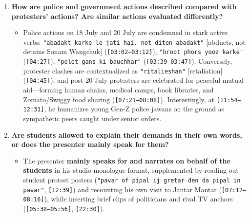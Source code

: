 \documentclass[10pt,a4paper]{article}
\begin{document}
\begin{enumerate}[leftmargin=1.6em, itemsep=4pt, topsep=4pt]
\begin{itemize}[leftmargin=1.4em, itemsep=2pt, topsep=2pt]
    \item Claims of foreign/political conspiracy are refuted by citing the \textbf{Ministry of External Affairs (MEA)} clarification that there was \texttt{"koi bhi pakistan, chaina ya phoren phanding nahin"} (\texttt{[00:40--00:48]}). Claims of police violence (\texttt{lathi charj}, \texttt{aansoo gais}, \texttt{pelet gans}, plainclothes harassment at \texttt{[03:39--04:17]}) are backed by ground eyewitness observation (\texttt{[07:12--08:16]}) and cellphone videos (\texttt{[04:53]}), while fairly acknowledging that \texttt{"wahan pe kaee sare police vale bhi hart hue the. ritalieshan mein un pe bhi hamla huaa tha"} (\texttt{[04:45--04:53]}). He also transparently notes CJP founder Abhijit Dipke's prior AAP social-media stint (\texttt{[02:19]}).
  \end{itemize}
  \item \textbf{How are police and government actions described compared with protesters' actions? Are similar actions evaluated differently?}
  \begin{itemize}[leftmargin=1.4em, itemsep=2pt, topsep=2pt]
    \item Police actions on 18 July and 20 July are condemned in stark active verbs: \texttt{"abadakt karke le jati hai. not diten abadakt"} [abducts, not detains Sonam Wangchuk] (\texttt{[03:02--03:12]}), \texttt{"broot phors yooz karke"} (\texttt{[04:27]}), \texttt{"pelet gans ki bauchhar"} (\texttt{[03:39--03:47]}). Conversely, protester clashes are contextualized as \texttt{"ritalieshan"} [retaliation] (\texttt{[04:45]}), and post-20-July protesters are celebrated for peaceful mutual aid---forming human chains, medical camps, book libraries, and Zomato/Swiggy food sharing (\texttt{[07:21--08:08]}). Interestingly, at \texttt{[11:54--12:31]}, he humanizes young Gen-Z police jawans on the ground as sympathetic peers caught under senior orders.
  \end{itemize}
  \item \textbf{Are students allowed to explain their demands in their own words, or does the presenter mainly speak for them?}
  \begin{itemize}[leftmargin=1.4em, itemsep=2pt, topsep=2pt]
    \item The presenter \textbf{mainly speaks for and narrates on behalf of the students} in his studio monologue format, supplemented by reading out student protest posters (\texttt{"pavar of pipal ij gretar den da pipal in pavar"}, \texttt{[12:39]}) and recounting his own visit to Jantar Mantar (\texttt{[07:12--08:16]}), while inserting brief clips of politicians and rival TV anchors (\texttt{[05:38--05:56]}, \texttt{[22:30]}).

\end{itemize}
\end{enumerate}
\end{document}
